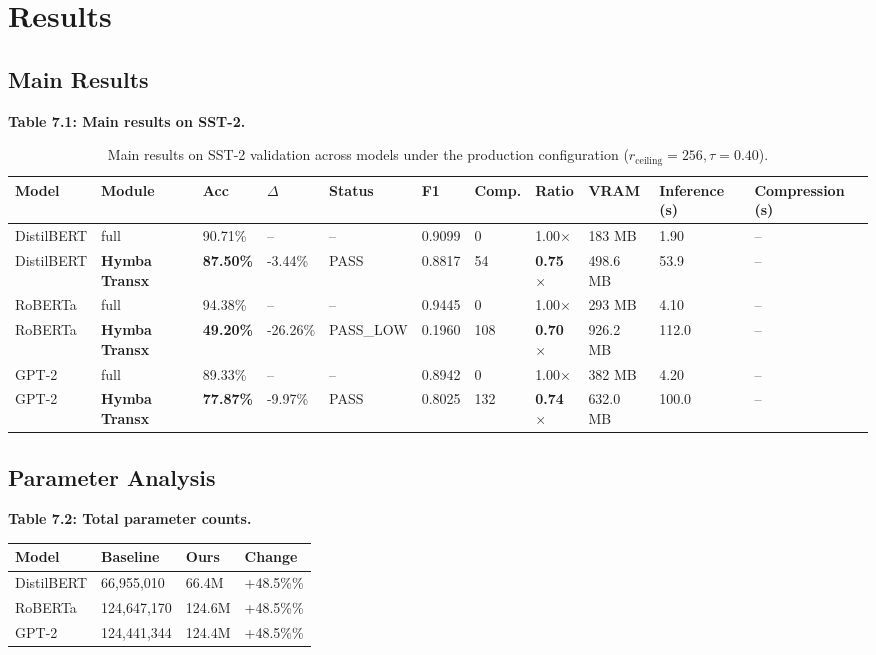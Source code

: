 \section{Results}

\subsection{Main Results}

\textbf{Table 7.1: Main results on SST-2.}

\begin{table}[t]
\centering
\small
\begin{tabular}{lllllllllll}
\toprule
\textbf{Model} & \textbf{Module} & \textbf{Acc} & \textbf{$\Delta$} & \textbf{Status} & \textbf{F1} & \textbf{Comp.} & \textbf{Ratio} & \textbf{VRAM} & \textbf{Inference (s)} & \textbf{Compression (s)} \\
\midrule
DistilBERT & full & 90.71\% & -- & -- & 0.9099 & 0 & 1.00$\times$ & 183 MB & 1.90 & -- \\
DistilBERT & \textbf{Hymba Transx} & \textbf{87.50\%} & -3.44\% & PASS & 0.8817 & 54 & \textbf{0.75$\times$} & 498.6 MB & 53.9 & -- \\
RoBERTa & full & 94.38\% & -- & -- & 0.9445 & 0 & 1.00$\times$ & 293 MB & 4.10 & -- \\
RoBERTa & \textbf{Hymba Transx} & \textbf{49.20\%} & -26.26\% & PASS_LOW & 0.1960 & 108 & \textbf{0.70$\times$} & 926.2 MB & 112.0 & -- \\
GPT-2 & full & 89.33\% & -- & -- & 0.8942 & 0 & 1.00$\times$ & 382 MB & 4.20 & -- \\
GPT-2 & \textbf{Hymba Transx} & \textbf{77.87\%} & -9.97\% & PASS & 0.8025 & 132 & \textbf{0.74$\times$} & 632.0 MB & 100.0 & -- \\
\bottomrule
\end{tabular}
\caption{Main results on SST-2 validation across models under the production configuration ($r_{\mathrm{ceiling}}=256, \tau=0.40$).}
\label{tab:main_sst2}
\end{table}

\subsection{Parameter Analysis}

\textbf{Table 7.2: Total parameter counts.}

\begin{table}[H]
\centering
\small
\begin{tabular}{llll}
\toprule
\textbf{Model} & \textbf{Baseline} & \textbf{Ours} & \textbf{Change} \\
\midrule
DistilBERT & 66,955,010 & 66.4M & +48.5\%\% \\
RoBERTa & 124,647,170 & 124.6M & +48.5\%\% \\
GPT-2 & 124,441,344 & 124.4M & +48.5\%\% \\
\bottomrule
\end{tabular}
\end{table}

